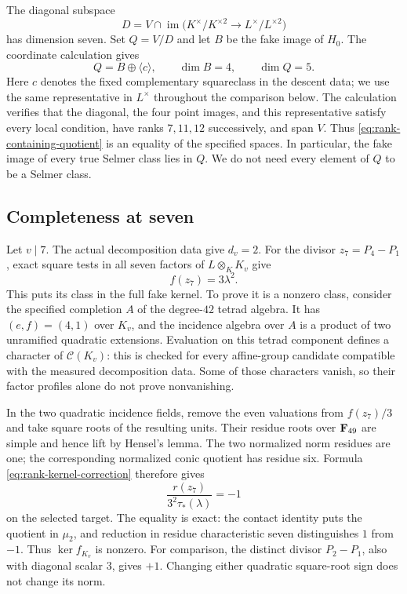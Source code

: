 The diagonal subspace
\[
 D=V\cap\operatorname{im}\bigl(K^\times/K^{\times2}
                        \longrightarrow L^\times/L^{\times2}\bigr)
\]
has dimension seven.  Set $Q=V/D$
and let $B$ be the fake image of $H_0$.  The coordinate calculation gives
\begin{equation}\label{eq:rank-containing-quotient}
 Q=B\oplus\langle c\rangle,\qquad \dim B=4,\qquad \dim Q=5.
\end{equation}
Here $c$ denotes the fixed complementary squareclass in the descent
data; we use the same representative in $L^\times$ throughout the
comparison below.  The calculation verifies that the diagonal,
the four point images, and this representative satisfy every local
condition, have ranks $7,11,12$ successively, and span $V$.
Thus \eqref{eq:rank-containing-quotient} is an equality of the specified
spaces.  In particular, the fake image of every true Selmer class lies
in $Q$.  We do not need every element of $Q$ to be a Selmer class.

\subsection{Completeness at seven}

Let $v\mid7$.  The actual decomposition data give $d_v=2$.
For the divisor $z_7=P_4-P_1$, exact square tests in all seven factors
of $L\otimes_K K_v$ give
\[
                            f(z_7)=3\lambda^2.
\]
This puts its class in the full fake kernel.  To prove it is a nonzero
class, consider the specified completion $A$ of the degree-$42$ tetrad
algebra.  It has $(e,f)=(4,1)$ over $K_v$, and the incidence algebra
over $A$ is a product of two unramified quadratic extensions.
Evaluation on this tetrad component defines a character of
$\mathcal C(K_v)$: this is checked for every affine-group candidate
compatible with the measured decomposition data.  Some of those
characters vanish, so their factor profiles alone do not prove
nonvanishing.

In the two quadratic incidence fields, remove the even valuations from
$f(z_7)/3$ and take square roots of the resulting units.  Their residue
roots over $\mathbf F_{49}$ are simple and hence lift by Hensel's lemma.
The two normalized norm residues are one; the corresponding normalized
conic quotient has residue six.  Formula
\eqref{eq:rank-kernel-correction} therefore gives
\[
           \frac{r(z_7)}{3^2\tau_*(\lambda)}=-1
\]
on the selected target.  The equality is exact: the contact identity
puts the quotient in $\mu_2$, and reduction in residue characteristic
seven distinguishes $1$ from $-1$.  Thus $\ker f_{K_v}$ is nonzero.
For comparison, the distinct divisor $P_2-P_1$, also with diagonal
scalar $3$, gives $+1$.  Changing either quadratic square-root sign
does not change its norm.

